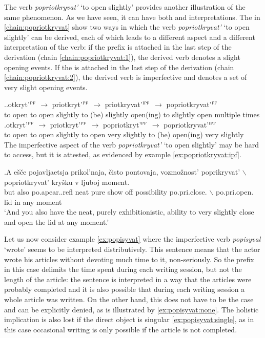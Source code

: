 The verb \textit{popriotkryvat'} `to open slightly' provides another illustration of the same phenomenon. As we have seen, it can have both  and  interpretations. The  in \ref{chain:popriotkryvat} show two ways in which the verb \textit{popriotkryvat'} `to open slightly' can be derived, each of which leads to a different aspect and a different interpretation of the verb: if the prefix  is attached in the last step of the derivation (chain \ref{chain:popriotkryvat:1}), the derived verb denotes a  slight opening events. If the  is attached in the last step of the derivation (chain \ref{chain:popriotkryvat:2}), the derived verb is imperfective and denotes a set of very slight opening events. 

\ex.\label{chain:popriotkryvat}\ag.\label{chain:popriotkryvat:1}otkryt'$^{\textsc{pf}}$ $\rightarrow$ priotkryt'$^{\textsc{pf}}$ $\rightarrow$ priotkryvat'$^{\textsc{ipf}}$ $\rightarrow$ popriotkryvat'$^{\textsc{pf}}$\\
{to open} {} {to open slightly} {} {to (be) slightly open(ing)} {} {to slightly open multiple times}\\
\bg.\label{chain:popriotkryvat:2}otkryt'$^{\textsc{pf}}$ $\rightarrow$ priotkryt'$^{\textsc{pf}}$ $\rightarrow$ popriotkryt'$^{\textsc{pf}}$ $\rightarrow$ popriotkryvat'$^{\textsc{ipf}}$\\
{to open} {} {to open slightly} {} {to open very slightly} {} {to (be) open(ing) very slightly}\\

The imperfective aspect of the verb \textit{popriotkryvat'} `to open slightly' may be hard to access, but it is attested, as evidenced by example \ref{ex:popriotkryvat:ipf}. 

\exg.\label{ex:popriotkryvat:ipf}A e\v{s}\v{c}e pojavljaetsja prikol'naja, \v{c}isto pontovaja, vozmo\v{z}nost' poprikryvat' {$\backslash$} popriotkryvat' kry\v{s}ku v ljuboj moment.\\
but also po.apear..refl neat pure {show off} possibility po.pri.close. {$\backslash$} po.pri.open. lid in any moment\\
`And you also have the neat, purely exhibitionistic, ability to very slightly close and open the lid at any moment.'

Let us now consider example \ref{ex:popisyvat} where the imperfective verb \textit{popisyval} `wrote' seems to be interpreted distributively. This sentence means that the actor wrote his articles without devoting much time to it, non-seriously. So the prefix in this case delimits the time spent during each writing session, but not the length of the article: the sentence is interpreted in a way that the articles were probably completed and it is also possible that during each writing session a whole article was written. On the other hand, this does not have to be the case and can be explicitly denied, as is illustrated by \ref{ex:popisyvat:none}. The holistic implication is also lost if the direct object is singular \ref{ex:popisyvat:single}, as in this case occasional writing is only possible if the article is not completed. 

